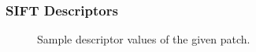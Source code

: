 \documentclass[aspectratio=169]{beamer}
\begin{document}
    \begin{frame}
        \frametitle{SIFT Descriptors}
        \begin{center}
   			\begin{figure}[thpb]
      		\centering
      		\setlength\fboxsep{0pt}
	  		\setlength\fboxrule{0.5pt}
      		\caption{\centering Sample descriptor values of the given patch.}
      		\label{figure1}
   			\end{figure}        
        \end{center}
    \end{frame}   
    
    
\end{document}
